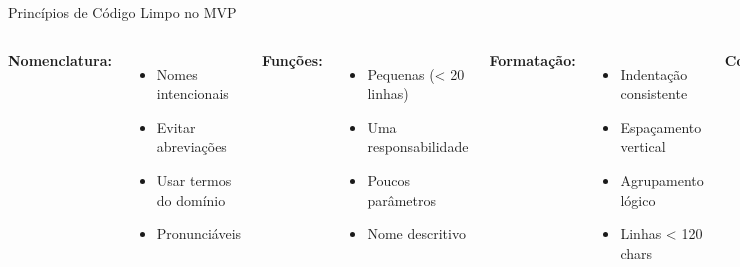 \documentclass[10pt]{beamer}
\begin{document}
\begin{frame}{Princípios de Código Limpo no MVP}
\begin{columns}[c]
\textbf{Nomenclatura:}
\begin{itemize}
    \item Nomes intencionais
    \item Evitar abreviações
    \item Usar termos do domínio
    \item Pronunciáveis
\end{itemize}

\textbf{Funções:}
\begin{itemize}
    \item Pequenas (< 20 linhas)
    \item Uma responsabilidade
    \item Poucos parâmetros
    \item Nome descritivo
\end{itemize}

\textbf{Formatação:}
\begin{itemize}
    \item Indentação consistente
    \item Espaçamento vertical
    \item Agrupamento lógico
    \item Linhas < 120 chars
\end{itemize}

\textbf{Comentários:}
\begin{itemize}
    \item Apenas quando necessário
    \item Explicam "por quê"
    \item Mantidos atualizados
    \item Não redundantes
\end{itemize}
\end{columns}
\end{frame}
\end{document}
